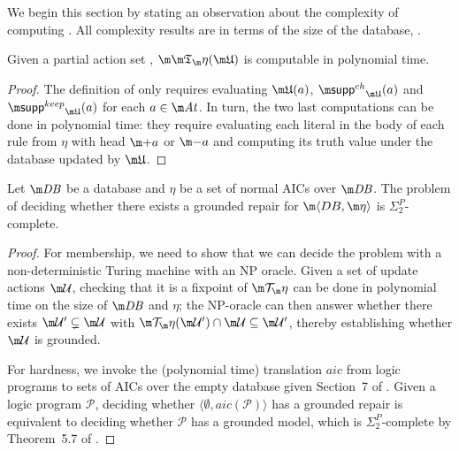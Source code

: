 



We begin this section by stating an observation about the complexity of computing \Ap.
All complexity results are in terms of the size of the database, \fulldb.
\begin{proposition}
  \label{prop:At-poly}
  Given a partial action set \UUU, 
  $\Ap(\UUU)$ is computable in polynomial time. %
\end{proposition}
\begin{proof}
    The definition of \Ap only requires evaluating $\UUU(a)$, $\suppin_{\UUU}(a)$ and $\suppout_{\UUU}(a)$ for each $a\in\atoms$.
    In turn, the two last computations can be done in polynomial time: they require evaluating each literal in the body of each rule from $\eta$ with head $\add a$ or $\remove a$ and computing its truth value under the database updated by $\UUU$.
\end{proof}


\begin{proposition}
  \label{prop:grounded-complexity}
  Let $\db$ be a database and $\eta$ be a set of normal AICs over $\db$.
  The problem of deciding whether there exists a  grounded repair for $\fulldb$ is $\Sigma^P_2$-complete.
\end{proposition}
\begin{proof}
  For membership, we need to show that we can decide the problem with a non-deterministic Turing machine with an NP oracle.
  Given a set of update actions $\UU$, checking that it is a fixpoint of $\Op$ can be done in polynomial time on the size of $\db$ and $\eta$; the NP-oracle can then answer whether there exists $\UU'\subsetneq\UU$ with $\Op(\UU')\cap\UU\subseteq\UU'$, thereby establishing whether $\UU$ is grounded.

  For hardness, we invoke the (polynomial time) translation $\mathit{aic}$ from logic programs to sets of AICs over the empty database given Section~7 of \citet{tplp/CaropreseT11}.
  Given a logic program $\mathcal P$, deciding whether $\langle\emptyset,\mathit{aic}(\mathcal P)\rangle$ has a grounded repair is equivalent to deciding whether $\mathcal P$ has a grounded model, which is $\Sigma^P_2$-complete by Theorem~5.7 of . 
\end{proof}


